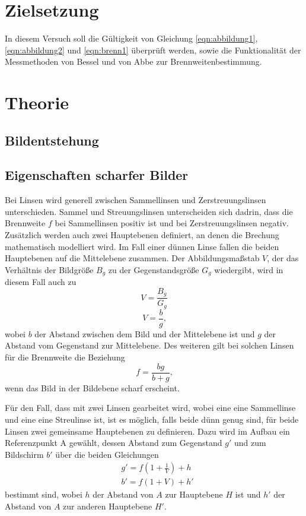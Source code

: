 \section{Zielsetzung}
In diesem Versuch soll die Gültigkeit von Gleichung \ref{eqn:abbildung1}, \ref{eqn:abbildung2} und \ref{eqn:brenn1} überprüft werden, sowie die Funktionalität der Messmethoden von Bessel und von Abbe zur Brennweitenbestimmung.


\section{Theorie}
\label{sec:Theorie}
\subsection{Bildentstehung}

\subsection{Eigenschaften scharfer Bilder}
    \noindent Bei Linsen wird generell zwischen Sammellinsen und Zerstreuungslinsen unterschieden. Sammel und Streuungslinsen unterscheiden sich dadrin, dass die Brennweite $f$ bei Sammellinsen positiv ist und bei Zerstreuungslinsen negativ.
    Zusätzlich werden auch zwei Hauptebenen definiert, an denen die Brechung mathematisch modelliert wird. Im Fall einer dünnen Linse fallen die beiden Hauptebenen auf die Mittelebene zusammen. Der Abbildungsmaßstab $V$, der das Verhältnis der Bildgröße $B_g$
    zu der Gegenstandsgröße $G_g$ wiedergibt, wird in diesem Fall auch zu
    \begin{equation}
        V=\frac{B_g}{G_g} 
        \label{eqn:abbildung1}
    \end{equation}
    \begin{equation}
        V=\frac{b}{g} \text{,}
        \label{eqn:abbildung2}
    \end{equation}
    \noindent wobei $b$ der Abstand zwischen dem Bild und der Mittelebene ist und $g$ der Abstand vom Gegenstand zur Mittelebene.
    Des weiteren gilt bei solchen Linsen für die Brennweite die Beziehung
    \begin{equation}
        f=\frac{bg}{b+g} \text{,}
        \label{eqn:brenn1}
    \end{equation}
    \noindent wenn das Bild in der Bildebene scharf erscheint.

    \noindent Für den Fall, dass mit zwei Linsen gearbeitet wird, wobei eine eine Sammellinse und eine eine Streulinse ist, ist es möglich, falls beide dünn genug sind, für beide Linsen zwei gemeinsame Hauptebenen zu definieren.
    Dazu wird im Aufbau ein Referenzpunkt A gewählt, dessen Abstand zum Gegenstand $g'$ und zum Bildschirm $b'$ über die beiden Gleichungen
    \begin{align}
       & g'=f(1+\frac{1}{V})+h \\
        & b'=f(1+V)+h'
        \label{eqn:abbe}
    \end{align}
    bestimmt sind, wobei $h$ der Abstand von $A$ zur Hauptebene $H$ ist und $h'$ der Abstand von $A$ zur anderen Hauptebene $H'$.
